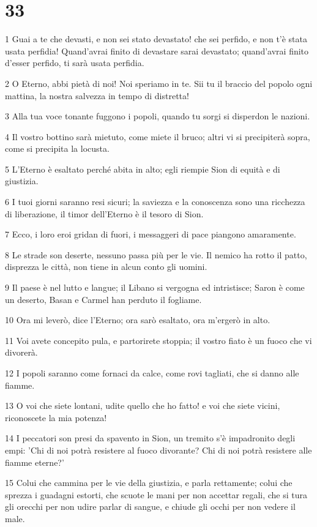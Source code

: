 \chapter{33}

\par 1 Guai a te che devasti, e non sei stato devastato! che sei perfido, e non t'è stata usata perfidia! Quand'avrai finito di devastare sarai devastato; quand'avrai finito d'esser perfido, ti sarà usata perfidia.
\par 2 O Eterno, abbi pietà di noi! Noi speriamo in te. Sii tu il braccio del popolo ogni mattina, la nostra salvezza in tempo di distretta!
\par 3 Alla tua voce tonante fuggono i popoli, quando tu sorgi si disperdon le nazioni.
\par 4 Il vostro bottino sarà mietuto, come miete il bruco; altri vi si precipiterà sopra, come si precipita la locusta.
\par 5 L'Eterno è esaltato perché abita in alto; egli riempie Sion di equità e di giustizia.
\par 6 I tuoi giorni saranno resi sicuri; la saviezza e la conoscenza sono una ricchezza di liberazione, il timor dell'Eterno è il tesoro di Sion.
\par 7 Ecco, i loro eroi gridan di fuori, i messaggeri di pace piangono amaramente.
\par 8 Le strade son deserte, nessuno passa più per le vie. Il nemico ha rotto il patto, disprezza le città, non tiene in alcun conto gli uomini.
\par 9 Il paese è nel lutto e langue; il Libano si vergogna ed intristisce; Saron è come un deserto, Basan e Carmel han perduto il fogliame.
\par 10 Ora mi leverò, dice l'Eterno; ora sarò esaltato, ora m'ergerò in alto.
\par 11 Voi avete concepito pula, e partorirete stoppia; il vostro fiato è un fuoco che vi divorerà.
\par 12 I popoli saranno come fornaci da calce, come rovi tagliati, che si danno alle fiamme.
\par 13 O voi che siete lontani, udite quello che ho fatto! e voi che siete vicini, riconoscete la mia potenza!
\par 14 I peccatori son presi da spavento in Sion, un tremito s'è impadronito degli empi: 'Chi di noi potrà resistere al fuoco divorante? Chi di noi potrà resistere alle fiamme eterne?'
\par 15 Colui che cammina per le vie della giustizia, e parla rettamente; colui che sprezza i guadagni estorti, che scuote le mani per non accettar regali, che si tura gli orecchi per non udire parlar di sangue, e chiude gli occhi per non vedere il male.
